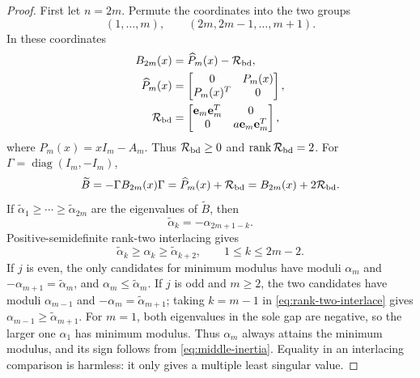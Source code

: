 \documentclass[12pt,anonymous]{iopjournal}
\numberwithin{equation}{section}
\theoremstyle{remark}
\DeclareMathOperator{\diag}{diag}
\begin{document}
\begin{proof}
First let \(n=2m\).  Permute the coordinates into the two groups
\[
 (1,\ldots,m),\qquad(2m,2m-1,\ldots,m+1).
\]
In these coordinates
\begin{equation}\label{eq:even-dilation}
\begin{aligned}
 B_{2m}(x)&=\widehat P_m(x)-\mathcal R_{\rm bd},\\
 \widehat P_m(x)&=\begin{bmatrix}0&P_m(x)\\P_m(x)^T&0\end{bmatrix},\\
 \mathcal R_{\rm bd}
 &=\begin{bmatrix}\mathbf e_m\mathbf e_m^T&0\\
 0&a \mathbf e_m\mathbf e_m^T\end{bmatrix},
\end{aligned}
\end{equation}
where \(P_m(x)=xI_m-A_m\).  Thus \(\mathcal R_{\rm bd}\geq0\) and
\(\operatorname{rank}\mathcal R_{\rm bd}=2\).  For
\(\Gamma=\diag(I_m,-I_m)\),
\[
 \widetilde B=-\Gamma B_{2m}(x)\Gamma
 =\widehat P_m(x)+\mathcal R_{\rm bd}
 =B_{2m}(x)+2\mathcal R_{\rm bd}.
\]
If \(\widetilde\alpha_1\geq\cdots\geq\widetilde\alpha_{2m}\) are the
eigenvalues of
\(\widetilde B\), then
\begin{equation}\label{eq:alpha-reflection}
 \widetilde\alpha_k=-\alpha_{2m+1-k}.
\end{equation}
Positive-semidefinite rank-two interlacing gives
\begin{equation}\label{eq:rank-two-interlace}
 \widetilde\alpha_k\geq\alpha_k\geq\widetilde\alpha_{k+2},
 \qquad1\leq k\leq2m-2.
\end{equation}
If \(j\) is even, the only candidates for minimum modulus
have moduli \(\alpha_m\) and
\(-\alpha_{m+1}=\widetilde\alpha_m\), and
\(\alpha_m\leq\widetilde\alpha_m\).  If \(j\) is odd and \(m\geq2\), the two
candidates have moduli \(\alpha_{m-1}\) and
\(-\alpha_m=\widetilde\alpha_{m+1}\); taking \(k=m-1\) in
\eqref{eq:rank-two-interlace} gives
\(\alpha_{m-1}\geq\widetilde\alpha_{m+1}\).  For \(m=1\), both eigenvalues in
the sole gap are negative, so the larger one \(\alpha_1\) has minimum
modulus.  Thus \(\alpha_m\) always attains the minimum modulus, and its
sign follows from \eqref{eq:middle-inertia}.  Equality in an interlacing
comparison is harmless: it only gives a multiple least singular value.


\end{proof}
\end{document}
